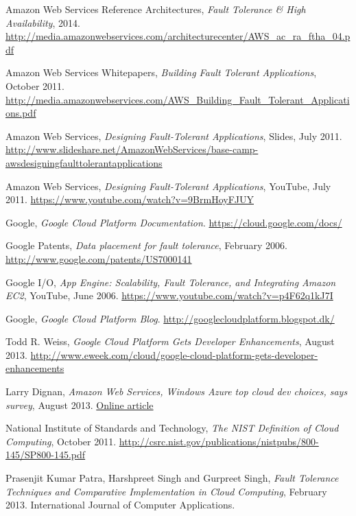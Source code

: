 \documentclass[11pt]{report}
\begin{document}
\begin{thebibliography}{99}

	Amazon Web Services Reference Architectures, \emph{Fault Tolerance \& High Availability}, 2014.
	\url{http://media.amazonwebservices.com/architecturecenter/AWS_ac_ra_ftha_04.pdf}
	
	Amazon Web Services Whitepapers, \emph{Building Fault Tolerant Applications}, October 2011.
	\url{http://media.amazonwebservices.com/AWS_Building_Fault_Tolerant_Applications.pdf}
	
	Amazon Web Services, \emph{Designing Fault-Tolerant Applications}, Slides, July 2011.
	\url{http://www.slideshare.net/AmazonWebServices/base-camp-awsdesigningfaulttolerantapplications}
	
	Amazon Web Services, \emph{Designing Fault-Tolerant Applications}, YouTube, July 2011.
	\url{https://www.youtube.com/watch?v=9BrmHoyFJUY}
	
	Google, \emph{Google Cloud Platform Documentation}.
	\url{https://cloud.google.com/docs/}	
	
	Google Patents, \emph{Data placement for fault tolerance}, February 2006.
	\url{http://www.google.com/patents/US7000141}
	
	Google I/O, \emph{App Engine: Scalability, Fault Tolerance, and Integrating Amazon EC2}, YouTube, June 2006.
	\url{https://www.youtube.com/watch?v=p4F62q1kJ7I}
	
	Google, \emph{Google Cloud Platform Blog}.
	\url{http://googlecloudplatform.blogspot.dk/}
	
	Todd R. Weiss, \emph{Google Cloud Platform Gets Developer Enhancements}, August 2013.
	\url{http://www.eweek.com/cloud/google-cloud-platform-gets-developer-enhancements}
	
	Larry Dignan, \emph{Amazon Web Services, Windows Azure top cloud dev choices, says survey}, August 2013.
	\href{http://www.zdnet.com/amazon-web-services-windows-azure-top-cloud-dev-choices-says-survey-7000019115/}
	{Online article}
	
	National Institute of Standards and Technology, \emph{The NIST Definition of Cloud Computing}, October 2011.
	\url{http://csrc.nist.gov/publications/nistpubs/800-145/SP800-145.pdf}
	
	Prasenjit Kumar Patra, Harshpreet Singh and Gurpreet Singh, \emph{Fault Tolerance Techniques and Comparative Implementation in Cloud Computing}, February 2013.
	International Journal of Computer Applications.

\end{thebibliography}
\end{document}
